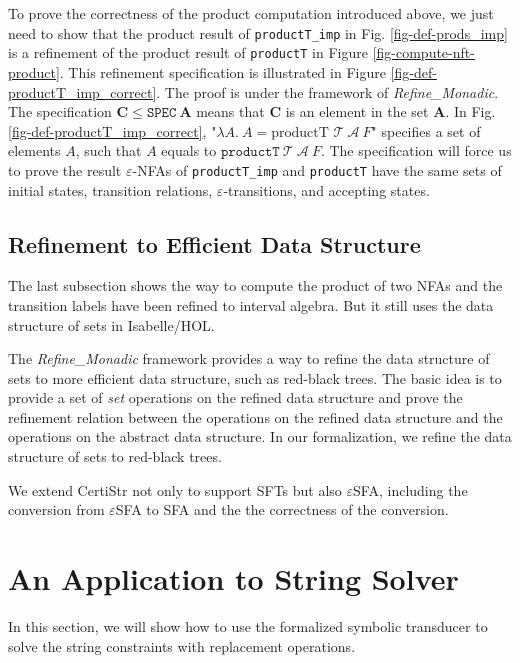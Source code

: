 \documentclass[a4paper,UKenglish,cleveref, autoref, anonymous, thm-restate]{lipics-v2021}
\begin{document}
  To prove the correctness of the product computation introduced above, we just need to show that the product result of \texttt{productT\_imp} in Fig. \ref{fig-def-prods_imp} is a refinement of the product result of \texttt{productT} in Figure \ref{fig-compute-nft-product}. This refinement specification is illustrated in Figure \ref{fig-def-productT_imp_correct}. The proof is under the framework of \emph{Refine\_Monadic}. The specification $\mathbf{C} \leq\texttt{SPEC}~\mathbf{A}$ means that $\mathbf{C}$ is an element in the set $\mathbf{A}$. In Fig. \ref{fig-def-productT_imp_correct}, "$\lambda A.~A = \text{productT } \mathcal{T}~\mathcal{A}~F$" specifies a set of elements $A$, such that $A$ equals to $\texttt{productT}~\mathcal{T}~\mathcal{A}~F$. 
  The specification will force us to prove the result $\varepsilon$-NFAs of \texttt{productT\_imp}  and \texttt{productT} have the same sets of initial states, transition relations, $\varepsilon$-transitions, and accepting states.

\subsection{Refinement to Efficient Data Structure}

The last subsection shows the way to compute the product of two NFAs and the transition labels have been refined to interval algebra. But it still uses the data structure of sets in Isabelle/HOL. 

The \emph{Refine\_Monadic} framework provides a way to refine the data structure of sets to more efficient data structure, such as red-black trees. The basic idea is to provide a set of \emph{set} operations on the refined data structure and prove the refinement relation between the operations on the refined data structure and the operations on the abstract data structure.
%
In our formalization, we refine the data structure of sets to red-black trees.

We extend CertiStr \cite{cpp/KanLRS22} not only to support SFTs but also $\varepsilon$SFA, including the conversion from $\varepsilon$SFA to SFA and the the correctness of the conversion. 







\section{An Application to String Solver}
\label{sec-app-str-solver}
In this section, we will show how to use the formalized symbolic transducer to solve the string constraints with replacement operations.
\end{document}
